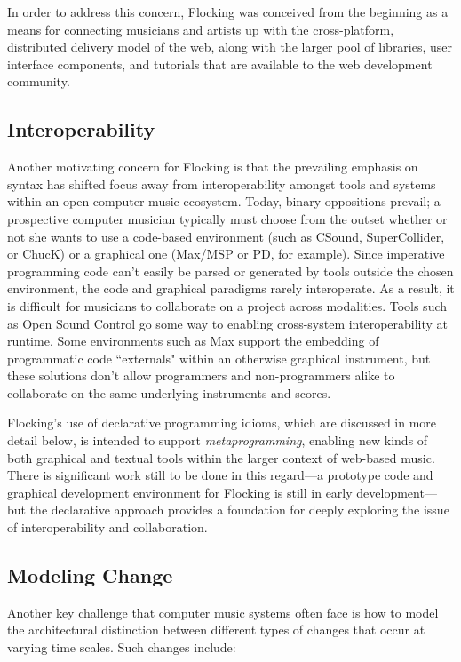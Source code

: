 \documentclass{article}
\begin{document}
In order to address this concern, Flocking was conceived from the beginning as a means for connecting musicians and artists up with the cross-platform, distributed delivery model of the web, along with the larger pool of libraries, user interface components, and tutorials that are available to the web development community.

\subsection{Interoperability}

Another motivating concern for Flocking is that the prevailing emphasis on syntax has shifted focus away from interoperability amongst tools and systems within an open computer music ecosystem. Today, binary oppositions prevail; a prospective computer musician typically must choose from the outset whether or not she wants to use a code-based environment (such as CSound, SuperCollider, or ChucK) or a graphical one (Max/MSP or PD, for example). Since imperative programming code can't easily be parsed or generated by tools outside the chosen environment, the code and graphical paradigms rarely interoperate. As a result, it is difficult for musicians to collaborate on a project across modalities. Tools such as Open Sound Control \cite{wright1997open} go some way to enabling cross-system interoperability at runtime. Some environments such as Max support the embedding of programmatic code ``externals" within an otherwise graphical instrument, but these solutions don't allow programmers and non-programmers alike to collaborate on the same underlying instruments and scores.

Flocking's use of declarative programming idioms, which are discussed in more detail below, is intended to support {\it metaprogramming}, enabling new kinds of both graphical and textual tools within the larger context of web-based music. There is significant work still to be done in this regard---a prototype code and graphical development environment for Flocking is still in early development---but the declarative approach provides a foundation for deeply exploring the issue of interoperability and collaboration.

\subsection{Modeling Change}

Another key challenge that computer music systems often face is how to model the architectural distinction between different types of changes that occur at varying time scales. Such changes include:
\end{document}

